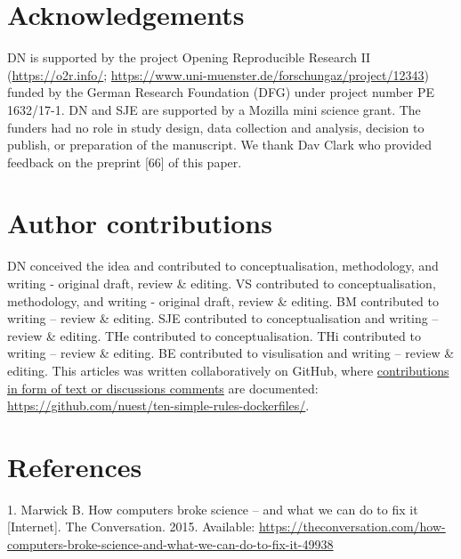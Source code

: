 \documentclass[10pt,letterpaper]{article}
\begin{document}
\hypertarget{acknowledgements}{%
\section*{Acknowledgements}\label{acknowledgements}}

DN is supported by the project Opening Reproducible Research II
(\href{https://o2r.info/}{https://o2r.info/};
\href{https://www.uni-muenster.de/forschungaz/project/12343}{https://www.uni-muenster.de/forschungaz/project/12343})
funded by the German Research Foundation (DFG) under project number PE
1632/17-1. DN and SJE are supported by a Mozilla mini science grant. The
funders had no role in study design, data collection and analysis,
decision to publish, or preparation of the manuscript. We thank Dav
Clark who provided feedback on the preprint {[}66{]} of this paper.

\hypertarget{contributions}{%
\section*{Author contributions}\label{contributions}}

DN conceived the idea and contributed to conceptualisation, methodology,
and writing - original draft, review \& editing. VS contributed to
conceptualisation, methodology, and writing - original draft, review \&
editing. BM contributed to writing -- review \& editing. SJE contributed
to conceptualisation and writing -- review \& editing. THe contributed
to conceptualisation. THi contributed to writing -- review \& editing.
BE contributed to visulisation and writing -- review \& editing. This
articles was written collaboratively on GitHub, where
\href{https://github.com/nuest/ten-simple-rules-dockerfiles/graphs/contributors}{contributions
in form of text or discussions comments} are documented:
\url{https://github.com/nuest/ten-simple-rules-dockerfiles/}.

\hypertarget{references}{%
\section*{References}\label{references}}

\hypertarget{refs}{}
\leavevmode\hypertarget{ref-marwick_how_2015}{}%
1. Marwick B. How computers broke science -- and what we can do to fix
it {[}Internet{]}. The Conversation. 2015. Available:
\url{https://theconversation.com/how-computers-broke-science-and-what-we-can-do-to-fix-it-49938}
\end{document}
